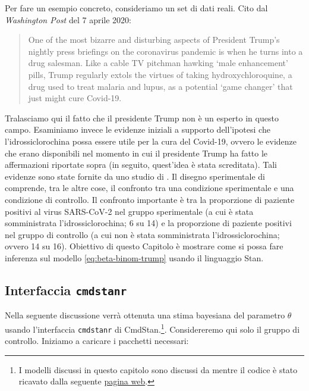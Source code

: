 \documentclass[
]{memoir}
\begin{document}
Per fare un esempio concreto, consideriamo un set di dati reali. Cito dal \emph{Washington Post} del 7 aprile 2020:

\begin{quote}
One of the most bizarre and disturbing aspects of President Trump's nightly press briefings on the coronavirus pandemic is when he turns into a drug salesman. Like a cable TV pitchman hawking `male enhancement' pills, Trump regularly extols the virtues of taking hydroxychloroquine, a drug used to treat malaria and lupus, as a potential `game changer' that just might cure Covid-19.
\end{quote}

Tralasciamo qui il fatto che il presidente Trump non è un esperto in questo campo. Esaminiamo invece le evidenze iniziali a supporto dell'ipotesi che l'idrossiclorochina possa essere utile per la cura del Covid-19, ovvero le evidenze che erano disponibili nel momento in cui il presidente Trump ha fatto le affermazioni riportate sopra (in seguito, quest'idea è stata screditata). Tali evidenze sono state fornite da uno studio di \citet{Gautret_2020}.
Il disegno sperimentale di \citet{Gautret_2020} comprende, tra le altre cose, il confronto tra una condizione sperimentale e una condizione di controllo. Il confronto importante è tra la proporzione di paziente positivi al virus SARS-CoV-2 nel gruppo sperimentale (a cui è stata somministrata l'idrossiclorochina; 6 su 14) e la proporzione di paziente positivi nel gruppo di controllo (a cui non è stata somministrata l'idrossiclorochina; ovvero 14 su 16). Obiettivo di questo Capitolo è mostrare come si possa fare inferenza sul modello \eqref{eq:beta-binom-trump} usando il linguaggio Stan.

\hypertarget{cmdstanr-gautret}{%
\subsection{\texorpdfstring{Interfaccia \texttt{cmdstanr}}{Interfaccia cmdstanr}}\label{cmdstanr-gautret}}

Nella seguente discussione verrà ottenuta una stima bayesiana del parametro \(\theta\) usando l'interfaccia \texttt{cmdstanr} di CmdStan.\footnote{I modelli discussi in questo capitolo sono discussi da \citet{gelman1995bayesian} mentre il codice è stato ricavato dalla seguente \href{http://avehtari.github.io/BDA_R_demos/demos_rstan/rstan_demo.html}{pagina web}.}. Considereremo qui solo il gruppo di controllo. Iniziamo a caricare i pacchetti necessari:
\end{document}
